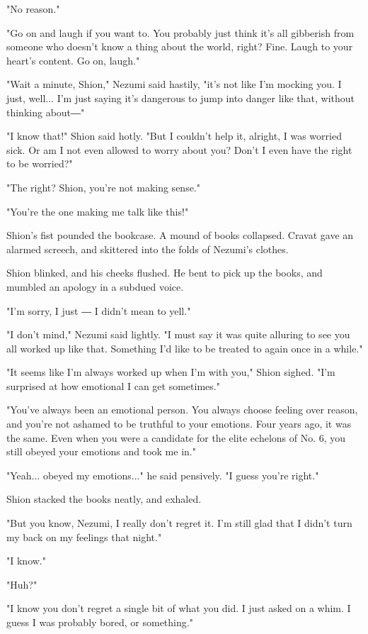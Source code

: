 "No reason."

"Go on and laugh if you want to. You probably just think it's all
gibberish from someone who doesn't know a thing about the world, right?
Fine. Laugh to your heart's content. Go on, laugh."

"Wait a minute, Shion," Nezumi said hastily, "it's not like I'm mocking
you. I just, well... I'm just saying it's dangerous to jump into danger
like that, without thinking about―"

"I know that!" Shion said hotly. "But I couldn't help it, alright, I was
worried sick. Or am I not even allowed to worry about you? Don't I even
have the right to be worried?"

"The right? Shion, you're not making sense."

"You're the one making me talk like this!"

Shion's fist pounded the bookcase. A mound of books collapsed. Cravat
gave an alarmed screech, and skittered into the folds of Nezumi's
clothes.

Shion blinked, and his cheeks flushed. He bent to pick up the books, and
mumbled an apology in a subdued voice.

"I'm sorry, I just ― I didn't mean to yell."

"I don't mind," Nezumi said lightly. "I must say it was quite alluring
to see you all worked up like that. Something I'd like to be treated to
again once in a while."

"It seems like I'm always worked up when I'm with you," Shion sighed.
"I'm surprised at how emotional I can get sometimes."

"You've always been an emotional person. You always choose feeling over
reason, and you're not ashamed to be truthful to your emotions. Four
years ago, it was the same. Even when you were a candidate for the elite
echelons of No. 6, you still obeyed your emotions and took me in."

"Yeah... obeyed my emotions..." he said pensively. "I guess you're
right."

Shion stacked the books neatly, and exhaled.

"But you know, Nezumi, I really don't regret it. I'm still glad that I
didn't turn my back on my feelings that night."

"I know."

"Huh?"

"I know you don't regret a single bit of what you did. I just asked on a
whim. I guess I was probably bored, or something."

